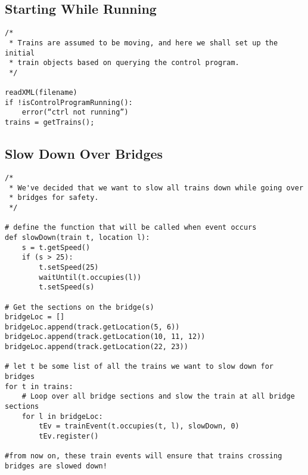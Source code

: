 \documentclass[a4paper,11pt,notitlepage]{article}
\begin{document}
\subsection{Starting While Running}
\begin{verbatim}
/*
 * Trains are assumed to be moving, and here we shall set up the initial
 * train objects based on querying the control program.
 */

readXML(filename)
if !isControlProgramRunning():
    error(“ctrl not running”)
trains = getTrains();
\end{verbatim}

\subsection{Slow Down Over Bridges}
\begin{verbatim}
/*
 * We've decided that we want to slow all trains down while going over
 * bridges for safety.
 */

# define the function that will be called when event occurs
def slowDown(train t, location l):
    s = t.getSpeed()
    if (s > 25):
        t.setSpeed(25)
        waitUntil(t.occupies(l))
        t.setSpeed(s)

# Get the sections on the bridge(s)
bridgeLoc = []
bridgeLoc.append(track.getLocation(5, 6))
bridgeLoc.append(track.getLocation(10, 11, 12))
bridgeLoc.append(track.getLocation(22, 23))

# let t be some list of all the trains we want to slow down for bridges
for t in trains:
    # Loop over all bridge sections and slow the train at all bridge sections
    for l in bridgeLoc:
        tEv = trainEvent(t.occupies(t, l), slowDown, 0)
        tEv.register()

#from now on, these train events will ensure that trains crossing bridges are slowed down!

\end{verbatim}
\end{document}
